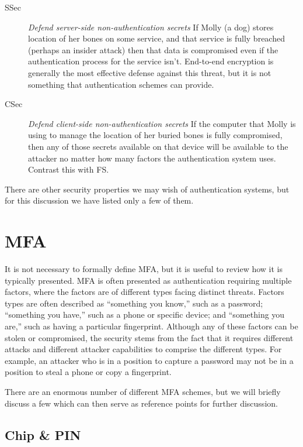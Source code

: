 \documentclass{soups}
\newcommand{\propdescription}[1]{\textit{#1}\newline}
\newcommand{\prop}[1]{\textsf{#1}}
\begin{document}
\begin{description}
  \item[SSec] \propdescription{Defend server-side non-authentication secrets}
    If Molly (a dog) stores location of her bones on some service,
    and that service is fully breached (perhaps an insider attack)
    then that data is compromised even if the authentication process for the service isn't.
    End-to-end encryption is generally the most effective defense against this threat,
    but it is not something that authentication schemes can provide.

  \item[CSec] \propdescription{Defend client-side non-authentication secrets}
    If the computer that Molly is using to manage the location of her buried bones is fully compromised,
    then any of those secrets available on that device will be available to the attacker no matter how many factors the authentication system uses.
    Contrast this with  \prop{FS}.
  
\end{description}

There are other security properties we may wish of authentication systems, but for this discussion we have listed only a few of them.

\section{MFA}

It is not necessary to formally define MFA, but it is useful to review how it is typically presented.
MFA is often presented as authentication requiring multiple factors, where the factors are of different types facing distinct threats.
Factors types are often described as “something you know,” such as a password;
“something you have,” such as a phone or specific device;
and “something you are,” such as having a particular fingerprint.
Although any of these factors can be stolen or compromised,
the security stems from the fact that it requires different attacks and different attacker capabilities to comprise the different types.
For example, an attacker who is in a position to capture a password may not be in a position to steal a phone or copy a fingerprint.

There are an enormous number of different MFA schemes,
but we will briefly discuss a few
which can then serve as reference points for further discussion.

\subsection{Chip \& PIN}
\end{document}
